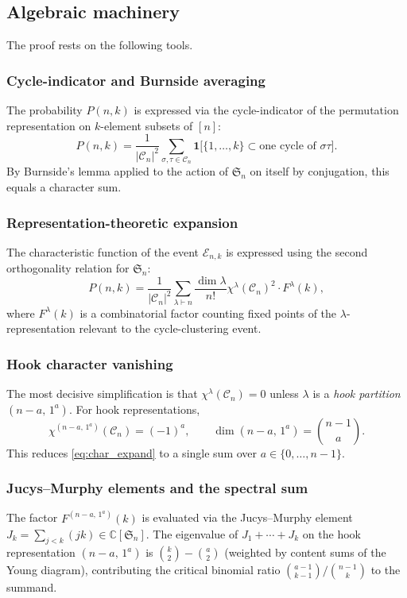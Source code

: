 \documentclass[12pt, a4paper]{amsart}
\theoremstyle{plain}
\theoremstyle{definition}
\theoremstyle{remark}
\newcommand{\C}{\mathcal{C}}
\newcommand{\Sn}{\mathfrak{S}_n}
\newcommand{\hook}[2]{(#1\!-\!#2,\,1^{#2})}
\begin{document}
\subsection{Algebraic machinery}

The proof rests on the following tools.

\subsubsection*{Cycle-indicator and Burnside averaging}
The probability $P(n,k)$ is expressed via the cycle-indicator of the permutation
representation on $k$-element subsets of $[n]$:
\begin{equation}\label{eq:burnside}
  P(n,k) = \frac{1}{|\C_n|^2}
            \sum_{\sigma,\tau\in\C_n}
            \mathbf{1}\bigl[\{1,\dots,k\}\subset\text{one cycle of }\sigma\tau\bigr].
\end{equation}
By Burnside's lemma applied to the action of $\Sn$ on itself by conjugation,
this equals a character sum.

\subsubsection*{Representation-theoretic expansion}
The characteristic function of the event $\mathcal{E}_{n,k}$ is expressed using
the second orthogonality relation for $\Sn$:
\begin{equation}\label{eq:char_expand}
  P(n,k) = \frac{1}{|\C_n|^2}
            \sum_{\lambda\vdash n}
            \frac{\dim\lambda}{n!}
            \chi^\lambda(\C_n)^2 \cdot F^\lambda(k),
\end{equation}
where $F^\lambda(k)$ is a combinatorial factor counting fixed points of the
$\lambda$-representation relevant to the cycle-clustering event.

\subsubsection*{Hook character vanishing}
The most decisive simplification is that $\chi^\lambda(\C_n)=0$ unless $\lambda$
is a \emph{hook partition} $\hook{n}{a}$.  For hook representations,
\begin{equation}\label{eq:hook_char}
  \chi^{\hook{n}{a}}(\C_n) = (-1)^a,
  \qquad
  \dim\hook{n}{a} = \binom{n-1}{a}.
\end{equation}
This reduces \eqref{eq:char_expand} to a single sum over $a\in\{0,\dots,n-1\}$.

\subsubsection*{Jucys--Murphy elements and the spectral sum}
The factor $F^{\hook{n}{a}}(k)$ is evaluated via the Jucys--Murphy element
$J_k = \sum_{j<k}(jk)\in\mathbb{C}[\Sn]$.  The eigenvalue of $J_1+\cdots+J_k$
on the hook representation $\hook{n}{a}$ is $\binom{k}{2}-\binom{a}{2}$
(weighted by content sums of the Young diagram), contributing the critical
binomial ratio $\binom{a-1}{k-1}/\binom{n-1}{k}$ to the summand.
\end{document}
